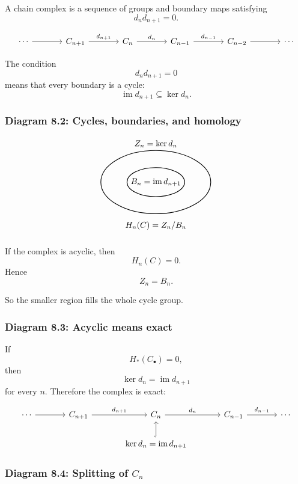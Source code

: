 \documentclass[12pt,a4paper]{article}
\theoremstyle{notespace}
\begin{document}
A chain complex is a sequence of groups and boundary maps satisfying
\[
d_n d_{n+1}=0.
\]

\[
\begin{tikzcd}[column sep=large]
	\cdots
	\arrow[r]
	&
	C_{n+1}
	\arrow[r,"d_{n+1}"]
	&
	C_n
	\arrow[r,"d_n"]
	&
	C_{n-1}
	\arrow[r,"d_{n-1}"]
	&
	C_{n-2}
	\arrow[r]
	&
	\cdots
\end{tikzcd}
\]

The condition
\[
d_n d_{n+1}=0
\]
means that every boundary is a cycle:
\[
\operatorname{im} d_{n+1}\subseteq \ker d_n.
\]

\subsubsection{Diagram 8.2: Cycles, boundaries, and homology}

\[
\begin{tikzpicture}[scale=1.1]
	\draw[thick] (0,0) ellipse (2.1 and 1.2);
	\draw[thick] (0,0) ellipse (1.1 and 0.55);
	
	\node at (0,1.45) {$Z_n=\ker d_n$};
	\node at (0,0) {$B_n=\operatorname{im}d_{n+1}$};
	
	\node at (0,-1.65) {$H_n(C)=Z_n/B_n$};
\end{tikzpicture}
\]

If the complex is acyclic, then
\[
H_n(C)=0.
\]
Hence
\[
Z_n=B_n.
\]

So the smaller region fills the whole cycle group.

\subsubsection{Diagram 8.3: Acyclic means exact}

If
\[
H_*(C_\bullet)=0,
\]
then
\[
\ker d_n=\operatorname{im}d_{n+1}
\]
for every \(n\). Therefore the complex is exact:

\[
\begin{tikzcd}[column sep=large]
	\cdots
	\arrow[r]
	&
	C_{n+1}
	\arrow[r,"d_{n+1}"]
	&
	C_n
	\arrow[r,"d_n"]
	&
	C_{n-1}
	\arrow[r,"d_{n-1}"]
	&
	\cdots
	\\
	&
	&
	\ker d_n=\operatorname{im}d_{n+1}
	\arrow[u,hook]
	&
	&
\end{tikzcd}
\]

\subsubsection{Diagram 8.4: Splitting of \(C_n\)}
\end{document}

